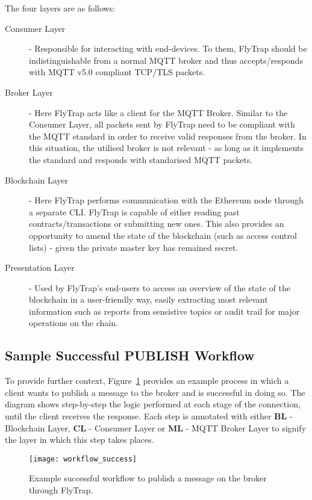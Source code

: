 The four layers are as follows:
\begin{description}
    \item[Consumer Layer] - Responsible for interacting with end-devices. To them, FlyTrap should be indistinguishable from a normal MQTT broker and thus accepts/responds with MQTT v5.0 compliant TCP/TLS packets. 
    \item[Broker Layer] - Here FlyTrap acts like a client for the MQTT Broker. Similar to the Consumer Layer, all packets sent by FlyTrap need to be compliant with the MQTT standard in order to receive valid responses from the broker. In this situation, the utilised broker is not relevant - as long as it implements the standard and responds with standarised MQTT packets.
    \item[Blockchain Layer] - Here FlyTrap performs communication with the Ethereum node through a separate CLI. FlyTrap is capable of either reading past contracts/transactions or submitting new ones. This also provides an opportunity to amend the state of the blockchain (such as access control lists) - given the private master key has remained secret.
    \item[Presentation Layer] - Used by FlyTrap's end-users to access an overview of the state of the blockchain in a user-friendly way, easily extracting most relevant information such as reports from sensistive topics or audit trail for major operations on the chain.
\end{description}


\subsection{Sample Successful PUBLISH Workflow}
To provide further context, Figure~\ref{fig:workflow_success} provides an example process in which a client wants to publish a message to the broker and is successful in doing so. The diagram shows step-by-step the logic performed at each stage of the connection, until the client receives the response. Each step is annotated with either \textbf{BL} - Blockchain Layer, \textbf{CL} - Consumer Layer or \textbf{ML} - MQTT Broker Layer to signify the layer in which this step takes places.
\begin{figure}[h]
    \centering
    \texttt{[image: workflow\_success]}
    \caption{Example successful workflow to publish a message on the broker through FlyTrap.}
    \label{fig:workflow_success}
\end{figure}

